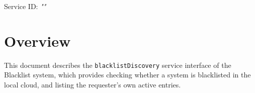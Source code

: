 \documentclass[a4paper]{arrowhead}
\begin{document}
\sloppy

\ArrowheadSetup

\begin{center}
  \vspace*{1cm}
  \huge{\arrowtitle}

  \vspace*{0.2cm}
  \LARGE{\arrowtype}
  \vspace*{1cm}

  \Large{Service ID: \textit{"\arrowid"}}

  \vspace*{\fill}


  \vspace*{1cm}
  \vspace*{\fill}

  \begin{abstract}
    This document describes the HTTP/1.1 protocol with TLS payload security and JSON payload encoding variant of the \texttt{blacklistDiscovery} service of the Blacklist system.
  \end{abstract}

  \vspace*{1cm}
\end{center}

\newpage

\tableofcontents
\newpage

\section{Overview}
\label{sec:overview}

This document describes the \texttt{blacklistDiscovery} service interface of the Blacklist system, which provides checking whether a system is blacklisted in the local cloud, and listing the requester's own active entries.
\end{document}
